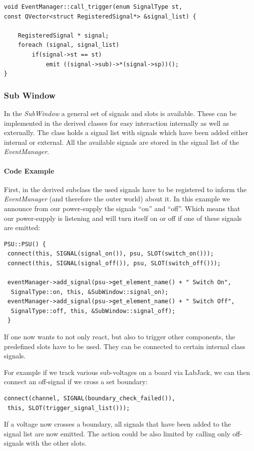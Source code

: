 \documentclass[10pt,a4paper]{article}
\begin{document}
\begin{lstlisting}[caption=EventManager.cpp]
void EventManager::call_trigger(enum SignalType st,
const QVector<struct RegisteredSignal*> &signal_list) {

    RegisteredSignal * signal;
    foreach (signal, signal_list)
        if(signal->st == st)
            emit ((signal->sub)->*(signal->sp))();
}
\end{lstlisting}

	\subsubsection{Sub Window}
	
	In the \textit{SubWindow} a general set of signals and slots is available. These can be implemented in the derived classes for easy interaction internally as well as externally. The class holds a signal list with signals which have been added either internal or external. All the available signals are stored in the signal list of the \textit{EventManager}.

		\paragraph{Code Example}

		First, in the derived subclass the used signals have to be registered to inform the \textit{EventManager} (and therefore the outer world) about it. In this example we announce from our power-supply the signals \enquote{on} and \enquote{off}. Which means that our power-supply is listening and will turn itself on or off if one of these signals are emitted:
		
\begin{lstlisting}[caption=PSU.cpp]
PSU::PSU() {
 connect(this, SIGNAL(signal_on()), psu, SLOT(switch_on()));
 connect(this, SIGNAL(signal_off()), psu, SLOT(switch_off()));

 eventManager->add_signal(psu->get_element_name() + " Switch On",
  SignalType::on, this, &SubWindow::signal_on);
 eventManager->add_signal(psu->get_element_name() + " Switch Off",
  SignalType::off, this, &SubWindow::signal_off);
 }
\end{lstlisting}

If one now wants to not only react, but also to trigger other components, the predefined slots have to be used. They can be connected to certain internal class signals. 

For example if we track various sub-voltages on a board via LabJack, we can then connect an off-signal if we cross a set boundary:

\begin{lstlisting}[caption=PSU.cpp]
connect(channel, SIGNAL(boundary_check_failed()),
 this, SLOT(trigger_signal_list()));
\end{lstlisting}

If a voltage now crosses a boundary, all signals that have been added to the signal list are now emitted. The action could be also limited by calling only off-signals with the other slots.
\end{document}
